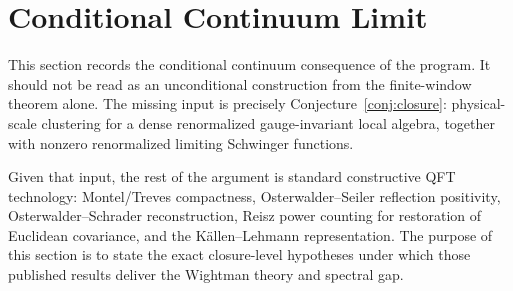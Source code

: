 \documentclass[11pt]{article}
\theoremstyle{definition}
\begin{document}

\section{Conditional Continuum Limit}\label{sec:ost}

This section records the conditional continuum consequence of the
program.  It should not be read as an unconditional construction from
the finite-window theorem alone.  The missing input is precisely
Conjecture~\ref{conj:closure}: physical-scale clustering for a dense
renormalized gauge-invariant local algebra, together with nonzero
renormalized limiting Schwinger functions.

Given that input, the rest of the argument is standard constructive
QFT technology: Montel/Treves compactness, Osterwalder--Seiler
reflection positivity, Osterwalder--Schrader reconstruction, Reisz
power counting for restoration of Euclidean covariance, and the
K\"allen--Lehmann representation.  The purpose of this section is to
state the exact closure-level hypotheses under which those published
results deliver the Wightman theory and spectral gap.
\end{document}
